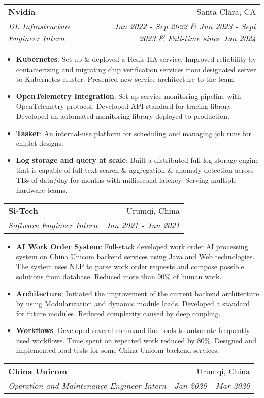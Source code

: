 \documentclass[letterpaper,11pt]{article}
\makeatletter
\newcommand{\resumeItem}[2]{
  \item\small{
    \textbf{#1}{: #2 \vspace{-2pt}}
  }
}
\newcommand{\resumeSubheading}[4]{
  \vspace{-1pt}\item
    \begin{tabular*}{0.97\textwidth}[t]{l@{\extracolsep{\fill}}r}
      \textbf{#1} & #2 \\
      \textit{\small#3} & \textit{\small #4} \\
    \end{tabular*}\vspace{-5pt}
}
\newcommand{\resumeSubSubheading}[2]{
    \begin{tabular*}{0.97\textwidth}{l@{\extracolsep{\fill}}r}
      \textit{\small#1} & \textit{\small #2} \\
    \end{tabular*}\vspace{-5pt}
}
\newcommand{\resumeSubHeadingListEnd}{\end{itemize}}
\newcommand{\resumeItemListStart}{\begin{itemize}}
\newcommand{\resumeItemListEnd}{\end{itemize}\vspace{-5pt}}
\makeatother
\begin{document}
\begin{CJK*}{UTF8}{gbsn}
    \resumeSubheading
      {Nvidia}{Santa Clara, CA}
      {DL Infrastructure Engineer Intern}{Jun 2022 - Sep 2022 \& Jun 2023 - Sept 2023 \& Full-time since Jun 2024}
      \resumeItemListStart
        \resumeItem{Kubernetes}
          {Set up \& deployed a Redis HA service. Improved reliability by containerizing and migrating chip verification services from designated server to Kubernetes cluster. Presented new service architecture to the team.}
        \resumeItem{OpenTelemetry Integration}
          {Set up service monitoring pipeline with OpenTelemetry protocol. Developed API standard for tracing library. Developed an automated monitoring library deployed to production.}
        \resumeItem{Tasker}
          {An internal-use platform for scheduling and managing job runs for chiplet designs.}
        \resumeItem{Log storage and query at scale}
          {Built a distributed full log storage engine that is capable of full text search \& aggregation \& anomaly detection across TBs of data/day for months with millisecond latency. Serving multiple hardware teams.}
      \resumeItemListEnd
      

    \resumeSubheading
      {Si-Tech}{Urumqi, China}
      {Software Engineer Intern}{Jan 2021 - Jun 2021}
      \resumeItemListStart
        \resumeItem{AI Work Order System}
          {Full-stack developed work order AI processing system on China Unicom backend services using Java and Web technologies. The system uses NLP to parse work order requests and compose possible solutions from database. Reduced more than 90\% of human work.}
        \resumeItem{Architecture}
          {Initiated the improvement of the current backend architecture by using Modularization and dynamic module loads. Developed a standard for future modules. Reduced complexity caused by deep coupling.}
        \resumeItem{Workflows}
          {Developed several command line tools to automate frequently used workflows. Time spent on repeated work reduced by 80\%. Designed and implemented load tests for some China Unicom backend services.}
      \resumeItemListEnd

    \resumeSubheading
      {China Unicom}{Urumqi, China}
      {Operation and Maintenance Engineer Intern}{Jan 2020 - Mar 2020}


\end{CJK*}
\end{document}
